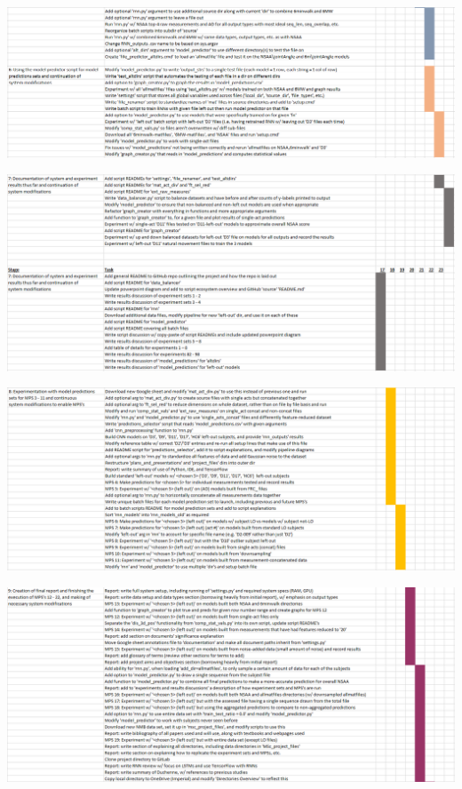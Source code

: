 \documentclass[12pt,twoside]{report}
\begin{document}
\begin{center}
\includegraphics[scale=0.4]{project_figures/fig12_5}
\end{center}

\begin{center}
\includegraphics[scale=0.4]{project_figures/fig12_6}
\end{center}

\begin{center}
\includegraphics[scale=0.4]{project_figures/fig12_7}
\end{center}

\begin{center}
\includegraphics[scale=0.4]{project_figures/fig12_8}
\end{center}
\end{document}
